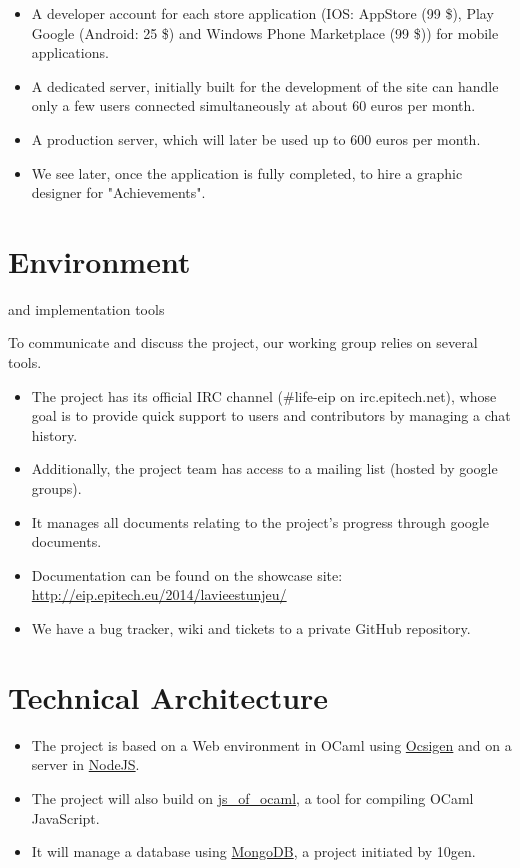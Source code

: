 \documentclass {life-en}
\begin{document}
\begin{itemize}
  \item A developer account for each store application (IOS: AppStore (99 \$), Play Google (Android: 25 \$) and Windows Phone Marketplace (99 \$)) for mobile applications.
  \item A dedicated server, initially built for the development of the site can handle only a few users connected simultaneously at about 60 euros per month.
  \item A production server, which will later be used up to 600 euros per month.
  \item We see later, once the application is fully completed, to hire a graphic designer for "Achievements".
\end{itemize}

\section{Environment} and implementation tools

To communicate and discuss the project, our working group relies on several tools.

\begin{itemize}
  \item The project has its official IRC channel (\#life-eip on irc.epitech.net), whose goal is to provide quick support to users and contributors by managing a chat history.
  \item Additionally, the project team has access to a mailing list (hosted by google groups).
  \item It manages all documents relating to the project's progress through google documents.
  \item Documentation can be found on the showcase site: \url{http://eip.epitech.eu/2014/lavieestunjeu/}
  \item We have a bug tracker, wiki and tickets to a private GitHub repository.
\end{itemize}

\section{Technical Architecture}

\begin{itemize}
  \item The project is based on a Web environment in OCaml using \href{http://ocsigen.org/}{Ocsigen} and on a server in \href{http://nodejs.org}{NodeJS}.
  \item The project will also build on \href{http://ocsigen.org/js_of_ocaml/}{js\_of\_ocaml}, a tool for compiling OCaml JavaScript.
  \item It will manage a database using \href{http://www.mongodb.org}{MongoDB}, a project initiated by 10gen.
\end{itemize}
\end{document}
